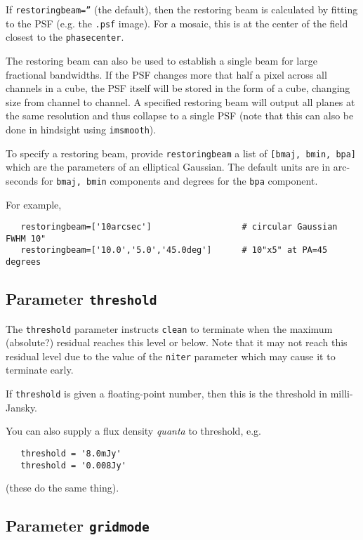 If {\tt restoringbeam=''} (the default), then the restoring beam
is calculated by fitting to the PSF (e.g. the {\tt .psf} image).
For a mosaic, this is at the center of the field closest to the
{\tt phasecenter}.

The restoring beam can also be used to establish a single beam for
large fractional bandwidths. If the PSF changes more that half a pixel
across all channels in a cube, the PSF itself will be stored in the
form of a cube, changing size from channel to channel. A specified
restoring beam will output all planes at the same resolution and thus
collapse to a single PSF (note that this can also be done in hindsight
using {\tt imsmooth}).

To specify a restoring beam, provide {\tt restoringbeam} a list of 
{\tt [bmaj, bmin, bpa]} which are the parameters of an elliptical
Gaussian.  The default units are in arc-seconds for {\tt bmaj, bmin}
components and degrees for the {\tt bpa} component.

For example,
\small
\begin{verbatim}
   restoringbeam=['10arcsec']                  # circular Gaussian FWHM 10"
   restoringbeam=['10.0','5.0','45.0deg']      # 10"x5" at PA=45 degrees
\end{verbatim}
\normalsize

\subsection{Parameter {\tt threshold} }
\label{section:im.clean.thresh}

The {\tt threshold} parameter instructs {\tt clean} to terminate when
the maximum (absolute?) residual reaches this level or below.  Note
that it may not reach this residual level due to the value of the
{\tt niter} parameter which may cause it to terminate early.

If {\tt threshold} is given a floating-point number, then this is the
threshold in milli-Jansky.

You can also supply a flux density {\em quanta} to threshold, e.g.
\small
\begin{verbatim}
   threshold = '8.0mJy'
   threshold = '0.008Jy'
\end{verbatim}
\normalsize
(these do the same thing).

\subsection{Parameter {\tt gridmode} }
\label{section:im.clean.gridmode}

